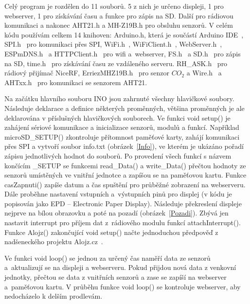             Celý program je rozdělen do 11 souborů. 5 z nich je určeno displeji, 1 pro webserver, 1 pro získávání času a funkce pro zápis na SD. Další pro rádiovou komunikaci a nakonec AHT21.h a MH-Z19B.h pro obsluhu senzorů. V celém kódu používám celkem 14 knihoven: Arduino.h, která je součástí Arduino IDE~\cite{ArduinoIDE}, SPI.h~\cite{SPI} pro komunikaci přes SPI, WiFi.h~\cite{WiFi}, WiFiClient.h~\cite{WiFiClient}, WebServer.h~\cite{WebServer}, ESPmDNS.h~\cite{ESPmDNS} a HTTPClient.h~\cite{HTTPClient} pro wifi a~webserver, FS.h~\cite{FS} a SD.h~\cite{SD} pro zápis na SD, time.h~\cite{time} pro získávání času ze vzdáleného serveru. \hbox{RH\_ASK.h}~\cite{RHASK} pro rádiový přijímač NiceRF, ErriezMHZ19B.h~\cite{ErriezMHZ19B} pro senzor $CO_2$ a Wire.h~\cite{Wire} a AHTxx.h~\cite{AHTxx} pro komunikaci se senzorem AHT21.

            Na začátku hlavního souboru INO jsou zahrnuté všechny hlavičkové soubory. Následuje deklarace a definice některých proměnných, většina proměnných je ale deklarována v příslušných hlavičkových souborech. Ve funkci void setup() je zahájení sériové komunikace a inicializace senzorů, modulů a funkcí. Například \hbox{microSD\_SETUP()} zkontroluje přítomnost paměťové karty, zahájí komunikaci přes SPI a vytvoří soubor info.txt (obrázek~\ref{Info}), ve kterém je ukázáno pořadí zápisu jednotlivých hodnot do souborů. Po provedení všech funkcí s názvem končícím \hbox{\_SETUP} se funkcemi \hbox{read\_Data()} a \hbox{write\_Data()} přečtou hodnoty ze senzorů umístěných ve vnitřní jednotce a zapíšou se na paměťovou kartu. Funkce casZapnuti() zapíše datum a čas spuštění pro průběžné zobrazení na webserveru. Dále proběhne nastavení vstupních a~výstupních pinů pro displej (v kódu je popisován jako EPD – Electronic Paper Display). Následuje překreslení displeje nejprve na bílou obrazovku a poté na pozadí (obrázek~\ref{Pozadi}). Zbývá jen nastavit interrupt pro příjem dat z~rádiového modulu funkcí attachInterrupt(). Funkce Alojz() zakončující void setup() načte jednoduchou předpověď z nadšeneckého projektu Alojz.cz~\cite{Alojz}.

            Ve funkci void loop() se jednou za určený čas naměří data ze senzorů a~aktualizují se na displeji a webserveru. Pokud přijdou nová data z venkovní jednotky, přečtou se data z vnitřních senzorů a zase se zapíší na webserver a~paměťovou kartu. V průběhu funkce void loop() se kontroluje webserver, aby nedocházelo k delším prodlevám.

